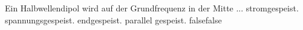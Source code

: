     {Ein Halbwellendipol wird auf der Grundfrequenz in der Mitte ...}
    {stromgespeist.}
    {spannungsgespeist.}
    {endgespeist.}
    {parallel gespeist.}
    {false}{false}